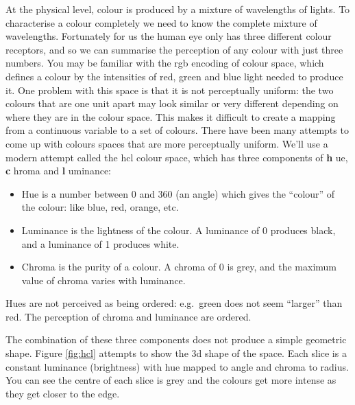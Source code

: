 At the physical level, colour is produced by a mixture of wavelengths of
lights. To characterise a colour completely we need to know the complete
mixture of wavelengths. Fortunately for us the human eye only has three
different colour receptors, and so we can summarise the perception of
any colour with just three numbers. You may be familiar with the rgb
encoding of colour space, which defines a colour by the intensities of
red, green and blue light needed to produce it. One problem with this
space is that it is not perceptually uniform: the two colours that are
one unit apart may look similar or very different depending on where
they are in the colour space. This makes it difficult to create a
mapping from a continuous variable to a set of colours. There have been
many attempts to come up with colours spaces that are more perceptually
uniform. We'll use a modern attempt called the hcl colour space, which
has three components of \textbf{h} ue, \textbf{c} hroma and \textbf{l}
uminance: 

\begin{itemize}
\item
  Hue is a number between 0 and 360 (an angle) which gives the
  ``colour'' of the colour: like blue, red, orange, etc.
\item
  Luminance is the lightness of the colour. A luminance of 0 produces
  black, and a luminance of 1 produces white.
\item
  Chroma is the purity of a colour. A chroma of 0 is grey, and the
  maximum value of chroma varies with luminance.
\end{itemize}

Hues are not perceived as being ordered: e.g.~green does not seem
``larger'' than red. The perception of chroma and luminance are ordered.

The combination of these three components does not produce a simple
geometric shape. Figure \ref{fig:hcl} attempts to show the 3d shape of
the space. Each slice is a constant luminance (brightness) with hue
mapped to angle and chroma to radius. You can see the centre of each
slice is grey and the colours get more intense as they get closer to the
edge.

